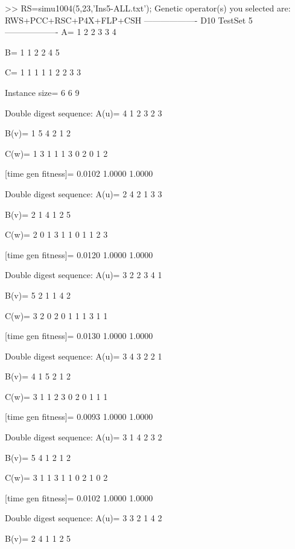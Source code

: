 >> RS=simu1004(5,23,'Ins5-ALL.txt');
Genetic operator(s) you selected are:
RWS+PCC+RSC+P4X+FLP+CSH
------------------- D10 TestSet 5 -------------------
A=
     1     2     2     3     3     4

B=
     1     1     2     2     4     5

C=
     1     1     1     1     1     2     2     3     3

Instance size=
     6     6     9

Double digest sequence:
A(u)=
     4     1     2     3     2     3

B(v)=
     1     5     4     2     1     2

C(w)=
     1     3     1     1     1     3     0     2     0     1     2

[time gen fitness]=
    0.0102    1.0000    1.0000

Double digest sequence:
A(u)=
     2     4     2     1     3     3

B(v)=
     2     1     4     1     2     5

C(w)=
     2     0     1     3     1     1     0     1     1     2     3

[time gen fitness]=
    0.0120    1.0000    1.0000

Double digest sequence:
A(u)=
     3     2     2     3     4     1

B(v)=
     5     2     1     1     4     2

C(w)=
     3     2     0     2     0     1     1     1     3     1     1

[time gen fitness]=
    0.0130    1.0000    1.0000

Double digest sequence:
A(u)=
     3     4     3     2     2     1

B(v)=
     4     1     5     2     1     2

C(w)=
     3     1     1     2     3     0     2     0     1     1     1

[time gen fitness]=
    0.0093    1.0000    1.0000

Double digest sequence:
A(u)=
     3     1     4     2     3     2

B(v)=
     5     4     1     2     1     2

C(w)=
     3     1     1     3     1     1     0     2     1     0     2

[time gen fitness]=
    0.0102    1.0000    1.0000

Double digest sequence:
A(u)=
     3     3     2     1     4     2

B(v)=
     2     4     1     1     2     5

